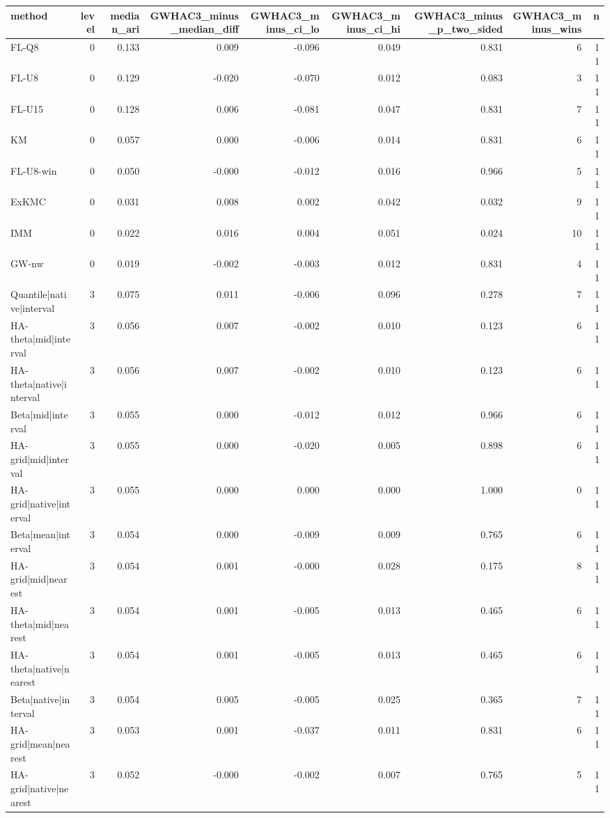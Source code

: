 \begin{tabular}{lrrrrrrrr}
\toprule
method & level & median_ari & GWHAC3_minus_median_diff & GWHAC3_minus_ci_lo & GWHAC3_minus_ci_hi & GWHAC3_minus_p_two_sided & GWHAC3_minus_wins & n \\
\midrule
FL-Q8 & 0 & 0.133 & 0.009 & -0.096 & 0.049 & 0.831 & 6 & 11 \\
FL-U8 & 0 & 0.129 & -0.020 & -0.070 & 0.012 & 0.083 & 3 & 11 \\
FL-U15 & 0 & 0.128 & 0.006 & -0.081 & 0.047 & 0.831 & 7 & 11 \\
KM & 0 & 0.057 & 0.000 & -0.006 & 0.014 & 0.831 & 6 & 11 \\
FL-U8-win & 0 & 0.050 & -0.000 & -0.012 & 0.016 & 0.966 & 5 & 11 \\
ExKMC & 0 & 0.031 & 0.008 & 0.002 & 0.042 & 0.032 & 9 & 11 \\
IMM & 0 & 0.022 & 0.016 & 0.004 & 0.051 & 0.024 & 10 & 11 \\
GW-nw & 0 & 0.019 & -0.002 & -0.003 & 0.012 & 0.831 & 4 & 11 \\
Quantile|native|interval & 3 & 0.075 & 0.011 & -0.006 & 0.096 & 0.278 & 7 & 11 \\
HA-theta|mid|interval & 3 & 0.056 & 0.007 & -0.002 & 0.010 & 0.123 & 6 & 11 \\
HA-theta|native|interval & 3 & 0.056 & 0.007 & -0.002 & 0.010 & 0.123 & 6 & 11 \\
Beta|mid|interval & 3 & 0.055 & 0.000 & -0.012 & 0.012 & 0.966 & 6 & 11 \\
HA-grid|mid|interval & 3 & 0.055 & 0.000 & -0.020 & 0.005 & 0.898 & 6 & 11 \\
HA-grid|native|interval & 3 & 0.055 & 0.000 & 0.000 & 0.000 & 1.000 & 0 & 11 \\
Beta|mean|interval & 3 & 0.054 & 0.000 & -0.009 & 0.009 & 0.765 & 6 & 11 \\
HA-grid|mid|nearest & 3 & 0.054 & 0.001 & -0.000 & 0.028 & 0.175 & 8 & 11 \\
HA-theta|mid|nearest & 3 & 0.054 & 0.001 & -0.005 & 0.013 & 0.465 & 6 & 11 \\
HA-theta|native|nearest & 3 & 0.054 & 0.001 & -0.005 & 0.013 & 0.465 & 6 & 11 \\
Beta|native|interval & 3 & 0.054 & 0.005 & -0.005 & 0.025 & 0.365 & 7 & 11 \\
HA-grid|mean|nearest & 3 & 0.053 & 0.001 & -0.037 & 0.011 & 0.831 & 6 & 11 \\
HA-grid|native|nearest & 3 & 0.052 & -0.000 & -0.002 & 0.007 & 0.765 & 5 & 11 \\

\end{tabular}
